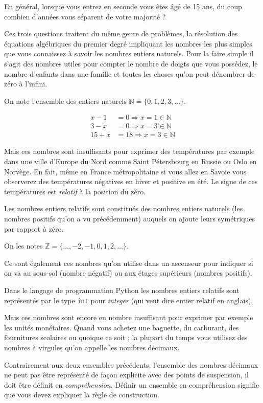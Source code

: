 \documentclass[11pt]{article}
\begin{document}
En général, lorsque vous entrez en seconde vous êtes âgé de 15 ans,
du coup combien d'années vous séparent de votre majorité ?

Ces trois questions traitent du même genre de problèmes, la
résolution des équations algébriques du premier degré impliquant
les nombres les plus simples que vous connaissez à savoir les
nombres entiers naturels. Pour la faire simple il s'agit des
nombres utiles pour compter le nombre de doigts que vous possédez,
le nombre d'enfants dans une famille et toutes les choses qu'on
peut dénombrer de zéro à l'infini.

On note l'ensemble des entiers naturels \(\mathbb{N} = \{0, 1, 2, 3,
   \dots \}\).

\begin{align}
x - 1 &= 0 \Rightarrow x = 1\in\mathbb{N}\\
3 - x &= 0 \Rightarrow x = 3\in\mathbb{N}\\
15 + x&= 18\Rightarrow x = 3\in\mathbb{N}
\end{align}

Mais ces nombres sont insuffisants pour exprimer des températures
par exemple dans une ville d'Europe du Nord comme Saint Pétersbourg
en Russie ou Oslo en Norvège. En fait, même en France
métropolitaine si vous allez en Savoie vous observerez des
températures négatives en hiver et positive en été. Le signe de ces
températures est \emph{relatif} à la position du zéro.

Les nombres entiers relatifs sont constitués des nombres entiers
naturels (les nombres positifs qu'on a vu précédemment) auquels on
ajoute leurs symétriques par rapport à zéro.

On les notes \(\mathbb{Z} = \{\dots, -2, -1, 0, 1, 2, \dots\}\).

Ce sont également ces nombres qu'on utilise dans un ascenseur pour
indiquer si on va au sous-sol (nombre négatif) ou aux étages
supérieurs (nombres positifs).

Dans le langage de programmation Python les nombres entiers
relatifs sont représentés par le type \texttt{int} pour \emph{integer} (qui
veut dire entier relatif en anglais).

Mais ces nombres sont encore en nombre insuffisant pour exprimer
par exemple les unités monétaires. Quand vous achetez une baguette,
du carburant, des fournitures scolaires ou quoique ce soit ; la
plupart du temps vous utilisez des nombres à virgules qu'on appelle
les nombres décimaux.

Contrairement aux deux ensembles précédents, l'ensemble des nombres
décimaux ne peut pas être représenté de façon explicite avec des
points de suspension, il doit être définit en
\emph{compréhension}. Définir un ensemble en compréhension signifie que
vous devez expliquer la règle de construction.
\end{document}
